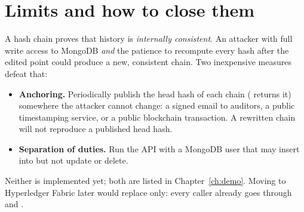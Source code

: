 \section{Limits and how to close them}\label{sec:ledger-limits}

A hash chain proves that history is \emph{internally consistent}. An attacker
with full write access to MongoDB \emph{and} the patience to recompute every
hash after the edited point could produce a new, consistent chain. Two
inexpensive measures defeat that:

\begin{itemize}
  \item \textbf{Anchoring.} Periodically publish the head hash of each chain
    ( returns it) somewhere the attacker cannot
    change: a signed email to auditors, a public timestamping service, or a
    public blockchain transaction. A rewritten chain will not reproduce a
    published head hash.
  \item \textbf{Separation of duties.} Run the API with a MongoDB user that may
    insert into  but not update or delete.
\end{itemize}

Neither is implemented yet; both are listed in Chapter~\ref{ch:demo}. Moving to
Hyperledger Fabric later would replace  only: every caller
already goes through  and .
